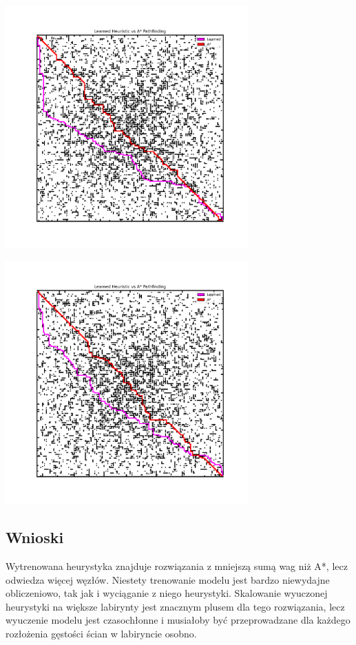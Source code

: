 \documentclass[a4paper,12pt]{article}
\begin{document}
  \begin{center}
    \includegraphics[width=0.7\textwidth]{../images/interesting_case1.png}
  \end{center}
  \begin{center}
    \includegraphics[width=0.7\textwidth]{../images/interesting_case2.png}
  \end{center}

  \subsection{Wnioski}
  Wytrenowana heurystyka znajduje rozwiązania z mniejszą sumą wag niż A*,
  lecz odwiedza więcej węzłów. Niestety trenowanie modelu jest bardzo niewydajne
  obliczeniowo, tak jak i wyciąganie z niego heurystyki. Skalowanie wyuczonej
  heurystyki na większe labirynty jest znacznym plusem dla tego rozwiązania,
  lecz wyuczenie modelu jest czasochłonne i musiałoby być przeprowadzane dla
  każdego rozłożenia gęstości ścian w labiryncie osobno.
\end{document}
